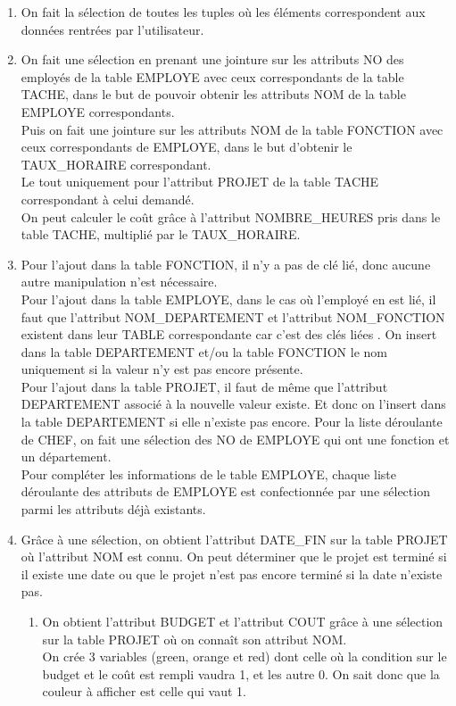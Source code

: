 \documentclass[a4paper, 11pt]{article}
\begin{document}
\begin{enumerate}

\item
On fait la sélection de toutes les tuples où les éléments correspondent aux données rentrées par l'utilisateur.\\
\item
On fait une sélection en prenant une jointure sur les attributs NO des employés de la table EMPLOYE avec ceux correspondants de la table TACHE, dans le but de pouvoir obtenir les attributs NOM de la table EMPLOYE correspondants.\\
Puis on fait une jointure sur les attributs NOM de la table FONCTION avec ceux correspondants de EMPLOYE, dans le but d'obtenir le TAUX\_HORAIRE correspondant.\\
Le tout uniquement pour l'attribut PROJET de la table TACHE correspondant à celui demandé.\\
On peut calculer le coût grâce à l'attribut NOMBRE\_HEURES pris dans le table TACHE, multiplié par le TAUX\_HORAIRE.\\

\item
Pour l'ajout dans la table FONCTION, il n'y a pas de clé lié, donc aucune autre manipulation n'est nécessaire.\\
Pour l'ajout dans la table EMPLOYE, dans le cas où l'employé en est lié, il faut que l'attribut NOM\_DEPARTEMENT et l'attribut NOM\_FONCTION existent dans leur TABLE correspondante car c'est des clés liées . On insert dans la table DEPARTEMENT et/ou la table FONCTION le nom uniquement si la valeur n'y est pas encore présente.\\
Pour l'ajout dans la table PROJET, il faut de même que l'attribut DEPARTEMENT associé à la nouvelle valeur existe. Et donc on l'insert dans la table DEPARTEMENT si elle n'existe pas encore. Pour la liste déroulante de CHEF, on fait une sélection des NO de EMPLOYE qui ont une fonction et un département.\\
Pour compléter les informations de le table EMPLOYE, chaque liste déroulante des attributs de EMPLOYE est confectionnée par une sélection parmi les attributs déjà existants.\\

\item
Grâce à une sélection, on obtient l'attribut DATE\_FIN sur la table PROJET où l'attribut NOM est connu. On peut déterminer que le projet est terminé si il existe une date ou que le projet n'est pas encore terminé si la date n'existe pas.\\
    \begin{enumerate}
	\item
	On obtient l'attribut BUDGET et l'attribut COUT grâce à une sélection sur la table PROJET où on connaît son attribut NOM.\\
	On crée 3 variables (green, orange et red) dont celle où la condition sur le budget et le coût est rempli vaudra 1, et les autre 0. On sait donc que la couleur à afficher est celle qui vaut 1.\\


\end{enumerate}
\end{enumerate}
\end{document}
